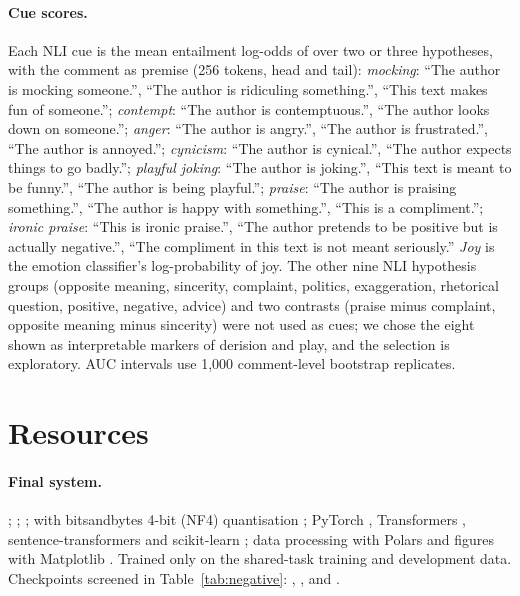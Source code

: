 \documentclass[11pt]{article}
\begin{document}
\paragraph{Cue scores.} Each NLI cue is the mean entailment log-odds of 
over two or three hypotheses, with the comment as premise (256 tokens, head and tail): \emph{mocking}: ``The author is mocking
someone.'', ``The author is ridiculing something.'', ``This text makes fun of someone.''; \emph{contempt}: ``The author
is contemptuous.'', ``The author looks down on someone.''; \emph{anger}: ``The author is angry.'', ``The author is
frustrated.'', ``The author is annoyed.''; \emph{cynicism}: ``The author is cynical.'', ``The author expects things to
go badly.''; \emph{playful joking}: ``The author is joking.'', ``This text is meant to be funny.'', ``The author is
being playful.''; \emph{praise}: ``The author is praising something.'', ``The author is happy with something.'', ``This
is a compliment.''; \emph{ironic praise}: ``This is ironic praise.'', ``The author pretends to be positive but is
actually negative.'', ``The compliment in this text is not meant seriously.'' \emph{Joy} is the emotion classifier's
log-probability of joy. The other nine NLI hypothesis groups (opposite meaning, sincerity, complaint, politics, exaggeration,
rhetorical question, positive, negative, advice) and two contrasts (praise minus complaint, opposite meaning minus
sincerity) were not used as cues; we chose the eight shown as interpretable
markers of derision and play, and the selection is exploratory. AUC intervals use 1,000 comment-level bootstrap
replicates.

\section{Resources}
\label{app:resources}
\raggedright
\paragraph{Final system.}  \citep{he2023debertav}; 
\citep{wang2022e5};  \citep{wang2024me5}; 
\citep{qwen35} with bitsandbytes 4-bit (NF4) quantisation \citep{dettmers2023qlora}; PyTorch \citep{paszke2019pytorch},
Transformers \citep{wolf-etal-2020-transformers}, sentence-transformers \citep{reimers-gurevych-2019-sentence} and
scikit-learn \citep{pedregosa2011sklearn}; data processing with Polars \citep{polars} and figures with Matplotlib
\citep{hunter2007matplotlib}. Trained only on the shared-task training and development data. Checkpoints screened in
Table~\ref{tab:negative}: , ,
\linebreak[0] and .
\end{document}
